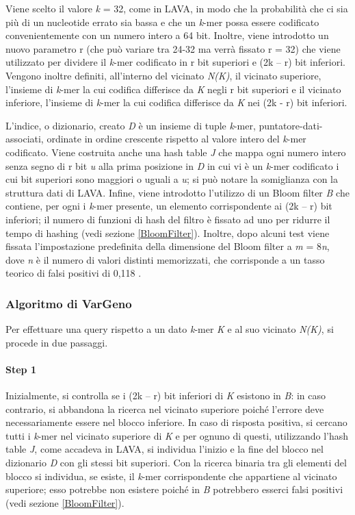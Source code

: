 \documentclass[../main.tex]{subfiles}
\begin{document}
Viene scelto il valore \textit{k} = 32, come in LAVA, in modo che la probabilità che ci sia più di un nucleotide errato sia bassa e che un \textit{k}-mer possa essere codificato convenientemente con un numero intero a 64 bit. Inoltre, viene introdotto un nuovo parametro r (che può variare tra 24-32 ma verrà fissato r = 32) che viene utilizzato per dividere il \textit{k}-mer codificato in r bit superiori e (2k – r) bit inferiori. Vengono inoltre definiti, all'interno del vicinato \textit{N(K)}, il vicinato superiore, l'insieme di \textit{k}-mer la cui codifica differisce da \textit{K} negli r bit superiori e il vicinato inferiore, l'insieme di \textit{k}-mer la cui codifica differisce da \textit{K} nei (2k - r) bit inferiori.

L'indice, o dizionario, creato \textit{D} è un insieme di tuple \textlangle \textit{k}-mer, puntatore-dati-associati\textrangle, ordinate in ordine crescente rispetto al valore intero del \textit{k}-mer codificato. Viene costruita anche una hash table \textit{J} che mappa ogni numero intero senza segno di r bit \textit{u} alla prima posizione in \textit{D} in cui vi è un \textit{k}-mer codificato i cui bit superiori sono maggiori o uguali a \textit{u}; si può notare la somiglianza con la struttura dati di LAVA. Infine, viene introdotto l'utilizzo di un Bloom filter \textit{B} che contiene, per ogni i \textit{k}-mer presente, un elemento corrispondente ai (2k – r) bit inferiori; il numero di funzioni di hash del filtro è fissato ad uno per ridurre il tempo di hashing (vedi sezione \ref{BloomFilter}). Inoltre, dopo alcuni test viene fissata l'impostazione predefinita della dimensione del Bloom filter a \textit{m} = 8\textit{n}, dove \textit{n} è il numero di valori distinti memorizzati, che corrisponde a un tasso teorico di falsi positivi di 0,118 \cite{sun-medvedev2018vargeno}.

\subsubsection{Algoritmo di VarGeno}

Per effettuare una query rispetto a un dato \textit{k}-mer \textit{K} e al suo vicinato \textit{N(K)}, si procede in due passaggi. 

\paragraph{Step 1} Inizialmente, si controlla se i (2k – r) bit inferiori di \textit{K} esistono in \textit{B}: in caso contrario, si abbandona la ricerca nel vicinato superiore poiché l'errore deve necessariamente essere nel blocco inferiore. In caso di risposta positiva, si cercano tutti i \textit{k}-mer nel vicinato superiore di \textit{K} e per ognuno di questi, utilizzando l'hash table \textit{J}, come accadeva in LAVA, si individua l'inizio e la fine del blocco nel dizionario \textit{D} con gli stessi bit superiori. Con la ricerca binaria tra gli elementi del blocco si individua, se esiste, il \textit{k}-mer corrispondente che appartiene al vicinato superiore; esso potrebbe non esistere poiché in \textit{B} potrebbero esserci falsi positivi (vedi sezione \ref{BloomFilter}).
\end{document}
